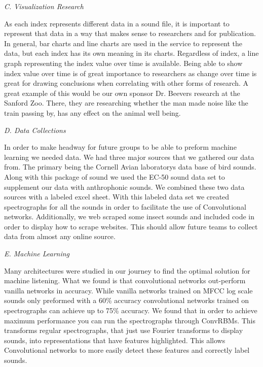 \begin{flushleft}
\noindent\textit{C. Visualization Research}\par
As each index represents different data in a sound file, it is important to represent that data in a way that makes sense to researchers and for publication. In general, bar charts and line charts are used in the service to represent the data, but each index has its own meaning in its charts. Regardless of index, a line graph representing the index value over time is available. Being able to show index value over time is of great importance to researchers as change over time is great for drawing conclusions when correlating with other forms of research. A great example of this would be our own sponsor Dr. Beever\textquotesingle s research at the Sanford Zoo. There, they are researching whether the man made noise like the train passing by, has any effect on the animal well being.

\noindent\textit{D. Data Collections}\par
In order to make headway for future groups to be able to preform machine learning we needed data. We had three major sources that we gathered our data from. The primary being the Cornell Avian laboratory\textquotesingle s data base of bird sounds. Along with this package of sound we used the EC-50 sound data set to supplement our data with anthrophonic sounds. We combined these two data sources with a labeled excel sheet. With this labeled data set we created spectrographs for all the sounds in order to facilitate the use of Convolutional networks. Additionally, we web scraped some insect sounds and included code in order to display how to scrape websites. This should allow future teams to collect data from almost any online source.

\noindent\textit{E. Machine Learning}\par
Many architectures were studied in our journey to find the optimal solution for machine listening. What we found is that convolutional networks out-perform vanilla networks in accuracy. While vanilla networks trained on MFCC log scale sounds only preformed with a 60\% accuracy convolutional networks trained on spectrographs can achieve up to 75\% accuracy. We found that in order to achieve maximum performance you can run the spectrographs through ConvRBMs. This transforms regular spectrographs, that just use Fourier transforms to display sounds, into representations that have features highlighted. This allows Convolutional networks to more easily detect these features and correctly label sounds.

\end{flushleft}
